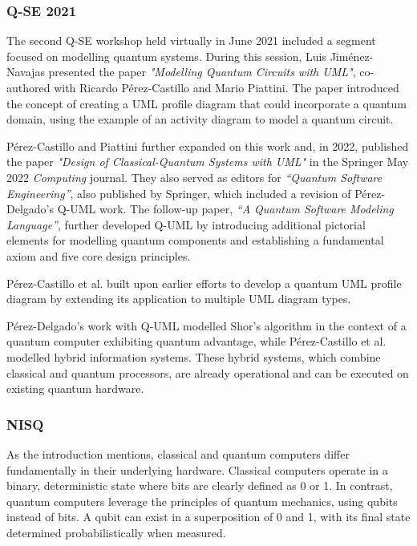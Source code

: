 \documentclass{article}
\begin{document}
{\subsubsection{Q-SE 2021}

The second Q-SE workshop held virtually in June 2021 included a segment focused on modelling quantum systems\cite{QSE2021}. During this session, Luis Jiménez-Navajas presented the paper \textit{"Modelling Quantum Circuits with UML"}, co-authored with Ricardo Pérez-Castillo and Mario Piattini\cite{Pérez-Castillo2021}. The paper introduced the concept of creating a UML profile diagram that could incorporate a quantum domain, using the example of an activity diagram to model a quantum circuit\cite{Pérez-Castillo2021}. 

Pérez-Castillo and Piattini further expanded on this work and, in 2022, published the paper \textit{"Design of Classical-Quantum Systems with UML"} in the Springer May 2022 \textit{Computing} journal\cite{Pérez-Castillo2022}\cite{Computing2022}. They also served as editors for \textit{“Quantum Software Engineering”}, also published by Springer, which included a revision of Pérez-Delgado's Q-UML work\cite{serrano2022quantum}. The follow-up paper, \textit{“A Quantum Software Modeling Language”}, further developed Q-UML by introducing additional pictorial elements for modelling quantum components and establishing a fundamental axiom and five core design principles\cite{Pérez-Delgado2022}.

Pérez-Castillo et al. built upon earlier efforts to develop a quantum UML profile diagram by extending its application to multiple UML diagram types. 

Pérez-Delgado's work with Q-UML modelled Shor's algorithm in the context of a quantum computer exhibiting quantum advantage, while Pérez-Castillo et al. modelled hybrid information systems. These hybrid systems, which combine classical and quantum processors, are already operational and can be executed on existing quantum hardware.

\subsubsection{NISQ}

As the introduction mentions, classical and quantum computers differ fundamentally in their underlying hardware. Classical computers operate in a binary, deterministic state where bits are clearly defined as 0 or 1. In contrast, quantum computers leverage the principles of quantum mechanics, using qubits instead of bits. A qubit can exist in a superposition of 0 and 1, with its final state determined probabilistically when measured. 

}
\end{document}
